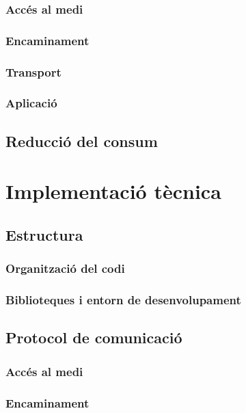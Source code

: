 \documentclass{tfgitic}[2025/06/06]
\begin{document}
\subsection{Accés al medi}
\subsection{Encaminament}
\subsection{Transport}
\subsection{Aplicació}
\section{Reducció del consum}

\chapter{Implementació tècnica}
\section{Estructura}
\subsection{Organització del codi}
\subsection{Biblioteques i entorn de desenvolupament}
\section{Protocol de comunicació}
\subsection{Accés al medi}
\subsection{Encaminament}
\end{document}
